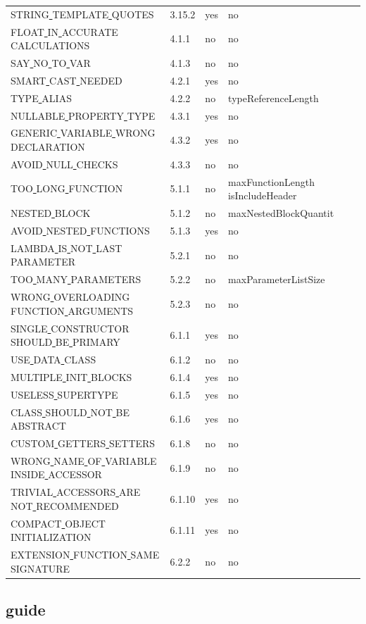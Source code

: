 \begin{center}
\begin{longtable}{ |l|p{0.8cm}|p{0.8cm}| p{3cm} | }
STRING\underline{ }TEMPLATE\underline{ }QUOTES & 3.15.2 &  yes  &   no  \\
FLOAT\underline{ }IN\underline{ }ACCURATE\underline{ }CALCULATIONS & 4.1.1 &  no  &   no  \\
SAY\underline{ }NO\underline{ }TO\underline{ }VAR & 4.1.3 &  no  &   no  \\
SMART\underline{ }CAST\underline{ }NEEDED & 4.2.1 &  yes  &   no  \\
TYPE\underline{ }ALIAS & 4.2.2 &  no  &   typeReferenceLength        \\
NULLABLE\underline{ }PROPERTY\underline{ }TYPE & 4.3.1 &  yes  &   no  \\
GENERIC\underline{ }VARIABLE\underline{ }WRONG\underline{ }DECLARATION & 4.3.2 &  yes  &   no  \\
AVOID\underline{ }NULL\underline{ }CHECKS & 4.3.3 &  no  &   no  \\
TOO\underline{ }LONG\underline{ }FUNCTION & 5.1.1 &  no  &   maxFunctionLength isIncludeHeader\\
NESTED\underline{ }BLOCK & 5.1.2 &  no  &   maxNestedBlockQuantit\\
AVOID\underline{ }NESTED\underline{ }FUNCTIONS & 5.1.3 &  yes  &   no  \\
LAMBDA\underline{ }IS\underline{ }NOT\underline{ }LAST\underline{ }PARAMETER & 5.2.1 &  no  &   no \\
TOO\underline{ }MANY\underline{ }PARAMETERS & 5.2.2 &  no  &   maxParameterListSize \\
WRONG\underline{ }OVERLOADING\underline{ }FUNCTION\underline{ }ARGUMENTS & 5.2.3 &  no  &   no \\
SINGLE\underline{ }CONSTRUCTOR\underline{ }SHOULD\underline{ }BE\underline{ }PRIMARY & 6.1.1 &  yes  &   no  \\
USE\underline{ }DATA\underline{ }CLASS & 6.1.2 &  no  &   no  \\
MULTIPLE\underline{ }INIT\underline{ }BLOCKS & 6.1.4 &  yes  &   no  \\
USELESS\underline{ }SUPERTYPE & 6.1.5 &  yes  &   no  \\
CLASS\underline{ }SHOULD\underline{ }NOT\underline{ }BE\underline{ }ABSTRACT & 6.1.6 &  yes  &   no  \\
CUSTOM\underline{ }GETTERS\underline{ }SETTERS & 6.1.8 &  no  &   no  \\
WRONG\underline{ }NAME\underline{ }OF\underline{ }VARIABLE\underline{ }INSIDE\underline{ }ACCESSOR & 6.1.9 &  no  &   no \\
TRIVIAL\underline{ }ACCESSORS\underline{ }ARE\underline{ }NOT\underline{ }RECOMMENDED & 6.1.10 &  yes  &   no  \\
COMPACT\underline{ }OBJECT\underline{ }INITIALIZATION & 6.1.11 &  yes  &   no  \\
EXTENSION\underline{ }FUNCTION\underline{ }SAME\underline{ }SIGNATURE & 6.2.2 &  no  &   no  \\
\hline
\end{longtable}
\end{center}
\subsection{guide}
